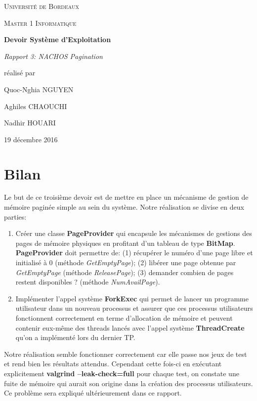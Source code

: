 \documentclass[12pt,a4paper]{article}
\begin{document}
\begin{titlepage}
\centering
{\scshape\LARGE Université de Bordeaux \par}
{\scshape\Large Master 1 Informatique \par}
\vspace{3cm}

{\Huge\bfseries Devoir Système d'Exploitation \par}%
\vspace{0.5cm}
{\Large\itshape Rapport 3: NACHOS Pagination \par}

\vfill
réalisé par \par
Quoc-Nghia \textsc{NGUYEN} \par
Aghiles \textsc{CHAOUCHI} \par
Nadhir \textsc{HOUARI} \par
\vfill

{\large 19 décembre 2016\par}

\end{titlepage}

\section{Bilan}
Le but de ce troisième devoir est de mettre en place un mécanisme de gestion de mémoire paginée simple au sein du système. Notre réalisation se divise en deux parties:

\begin{enumerate}
\item Créer une classe \textbf{PageProvider} qui encapsule les mécanismes de gestions des pages de mémoire physiques en profitant d'un tableau de type \textbf{BitMap}. \textbf{PageProvider} doit permettre de: (1) récupérer le numéro d'une page libre et initialisé à 0 (méthode \textit{GetEmptyPage}); (2) libérer une page obtenue par \textit{GetEmptyPage} (méthode \textit{ReleasePage}); (3) demander combien de pages restent disponibles ? (méthode \textit{NumAvailPage}).
\item Implémenter l'appel système \textbf{ForkExec} qui permet de lancer un programme utilisateur dans un nouveau processus et assurer que ces processus utilisateurs fonctionnent correctement en terme d'allocation de mémoire et peuvent contenir eux-même des threads lancés avec l'appel système \textbf{ThreadCreate} qu'on a implémenté lors du dernier TP.
\end{enumerate}

Notre réalisation semble fonctionner correctement car elle passe nos jeux de test et rend bien les résultats attendus. Cependant cette fois-ci en exécutant explicitement \textbf{valgrind --leak-check=full} pour chaque test, on constate une fuite de mémoire qui aurait son origine dans la création des processus utilisateurs. Ce problème sera expliqué ultérieurement dans ce rapport.
\end{document}
